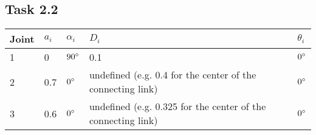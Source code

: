 \subsection*{Task 2.2}
\begin{center}
	\begin{tabular}{ | l | l | l | l | l |}
		\hline
		Joint & $a_{i}$ & $\alpha_{i}$ & $D_i$ & $\theta_i$ \\ \hline
		1 & 0 & $90\degree$ & 0.1 & $0\degree$\\ \hline
		2 & 0.7 & $0\degree$ & undefined (e.g. 0.4 for the center of the connecting link) & $0\degree$\\ \hline
		3 & 0.6 & $0\degree$ & undefined (e.g. 0.325 for the center of the connecting link) & $0\degree$\\ \hline
	\end{tabular}
\end{center}